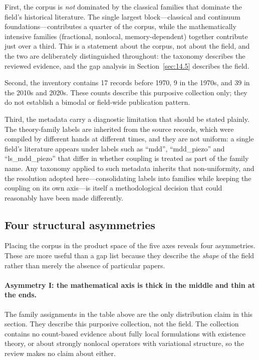 First, the corpus is \emph{not} dominated by the classical families that dominate the field's historical literature. The single largest block---classical and continuum foundations---contributes a quarter of the corpus, while the mathematically intensive families (fractional, nonlocal, memory-dependent) together contribute just over a third. This is a statement about the corpus, not about the field, and the two are deliberately distinguished throughout: the taxonomy describes the reviewed evidence, and the gap analysis in Section~\ref{sec:14.5} describes the field.

Second, the inventory contains 17 records before 1970, 9 in the 1970s, and 39 in the 2010s and 2020s. These counts describe this purposive collection only; they do not establish a bimodal or field-wide publication pattern.

Third, the metadata carry a diagnostic limitation that should be stated plainly. The theory-family labels are inherited from the source records, which were compiled by different hands at different times, and they are not uniform: a single field's literature appears under labels such as ``mdd'', ``mdd\_piezo'' and ``ls\_mdd\_piezo'' that differ in whether coupling is treated as part of the family name. Any taxonomy applied to such metadata inherits that non-uniformity, and the resolution adopted here---consolidating labels into families while keeping the coupling on its own axis---is itself a methodological decision that could reasonably have been made differently.

\subsection{Four structural asymmetries}
\label{sec:14.4}

Placing the corpus in the product space of the five axes reveals four asymmetries. These are more useful than a gap list because they describe the \emph{shape} of the field rather than merely the absence of particular papers.

\paragraph{Asymmetry I: the mathematical axis is thick in the middle and thin at the ends.}
The family assignments in the table above are the only distribution claim in this section. They describe this purposive collection, not the field. The collection contains no count-based evidence about fully local formulations with existence theory, or about strongly nonlocal operators with variational structure, so the review makes no claim about either.

